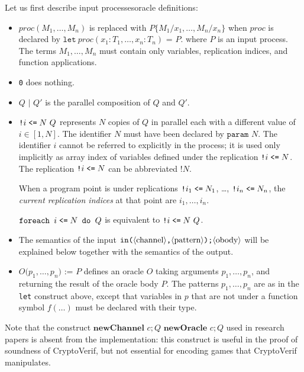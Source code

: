 Let us first describe \ifchannels input processes\else oracle definitions\fi:
\begin{itemize}

\item $\mathit{proc}(M_1, \dots, M_n)$ is replaced with $P\{M_1/x_1, \dots, M_n/x_n\}$ when $\mathit{proc}$ is declared by $\texttt{let}\ \mathit{proc}(x_1:T_1, \dots, x_n:T_n)\texttt{ = }P\texttt{.}$
where $P$ is an input process.
The terms $M_1, \dots, M_n$ must contain only variables, replication indices, and function applications.

\item \texttt{0} does nothing.

\item $Q \texttt{ | } Q'$ is the parallel composition of $Q$ and $Q'$.

\item $\texttt{!}i\mathrel{\texttt{<=}} N\ Q$ represents $N$ copies of $Q$ in
parallel each with a different value of $i \in [1,N]$.  The identifier
$N$ must have been declared by $\texttt{param }N$.  The identifier $i$
cannot be referred to explicitly in the process; it is used only
implicitly as array index of variables defined under the replication
$\texttt{!}i\mathrel{\texttt{<=}} N$. The replication $\texttt{!}i\mathrel{\texttt{<=}} N$ can be 
abbreviated $\texttt{!} N$.

When a program point is under replications $\texttt{!}i_1\mathrel{\texttt{<=}} N_1$,
\ldots, $\texttt{!}i_n\mathrel{\texttt{<=}} N_n$, the \emph{current replication
indices} at that point are $i_1, \ldots, i_n$.

$\texttt{foreach }i\mathrel{\texttt{<=}} N\texttt{ do }Q$ is equivalent to
$\texttt{!}i\mathrel{\texttt{<=}} N\ Q$.

\ifchannels
\item The semantics of the input 
$\texttt{in(}\langle\textrm{channel}\rangle\texttt{,}\langle\textrm{pattern}\rangle\texttt{);}\langle\textrm{obody}\rangle$
will be explained below together with the
semantics of the output. 

\else
\item $O\texttt{(}p_1, \ldots, p_n\texttt{) := }P$ defines an oracle
$O$ taking arguments $p_1, \ldots, p_n$, and returning the result of
the oracle body $P$. The patterns $p_1, \ldots, p_n$ are as in the
\texttt{let} construct above, except that variables in $p$ that are
not under a function symbol $f(\ldots)$ must be declared with their
type.

\fi

\end{itemize}
Note that the construct \ifchannels $\textbf{newChannel }c;Q$ \else
$\textbf{newOracle }c;Q$ \fi used in research papers
is absent from the implementation: this construct is useful in the proof
of soundness of CryptoVerif, but not essential for encoding games
that CryptoVerif manipulates.

